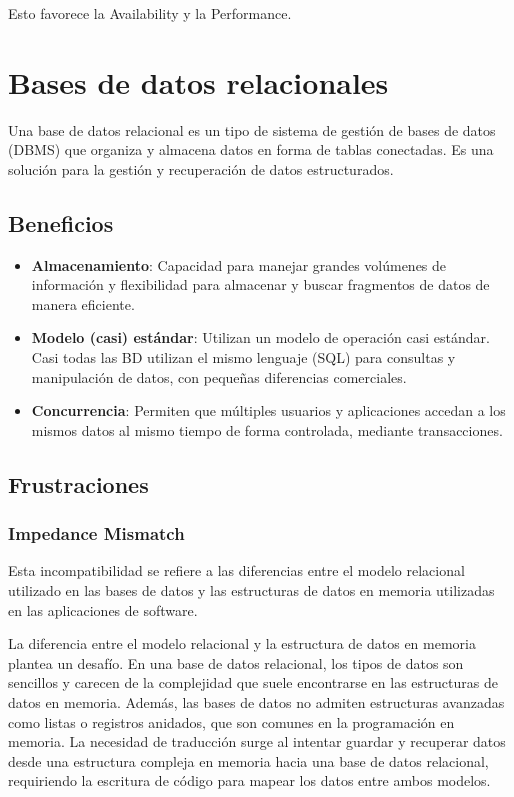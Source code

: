 \documentclass{article}
\begin{document}
		Esto favorece la Availability y la Performance.
		
		
		\section{Bases de datos relacionales}
		Una base de datos relacional es un tipo de sistema de gestión de bases de datos (DBMS) que organiza y almacena datos en forma de tablas conectadas. Es una solución para la gestión y recuperación de datos estructurados.
		
		
		\subsection{Beneficios}
		\begin{itemize}
			\item {\textbf{Almacenamiento}}: Capacidad para manejar grandes volúmenes de información y flexibilidad para almacenar y buscar fragmentos de datos de manera eficiente.
			
			\item {\textbf{Modelo (casi) estándar}}: Utilizan un modelo de operación casi estándar.
			Casi todas las BD utilizan el mismo lenguaje (SQL) para consultas y manipulación de datos, con pequeñas diferencias comerciales.
			
			\item {\textbf{Concurrencia}}: Permiten que múltiples usuarios y aplicaciones accedan a los mismos datos al mismo tiempo de forma controlada, mediante transacciones.
		\end{itemize}
		
	
		
		\subsection{Frustraciones}
		
		\subsubsection{Impedance Mismatch}
		Esta incompatibilidad se refiere a las diferencias entre el modelo relacional utilizado en las bases de datos y las estructuras de datos en memoria utilizadas en las aplicaciones de software.
		
		La diferencia entre el modelo relacional y la estructura de datos en memoria plantea un desafío. En una base de datos relacional, los tipos de datos son sencillos y carecen de la complejidad que suele encontrarse en las estructuras de datos en memoria. Además, las bases de datos no admiten estructuras avanzadas como listas o registros anidados, que son comunes en la programación en memoria. La necesidad de traducción surge al intentar guardar y recuperar datos desde una estructura compleja en memoria hacia una base de datos relacional, requiriendo la escritura de código para mapear los datos entre ambos modelos.
		
\end{document}
